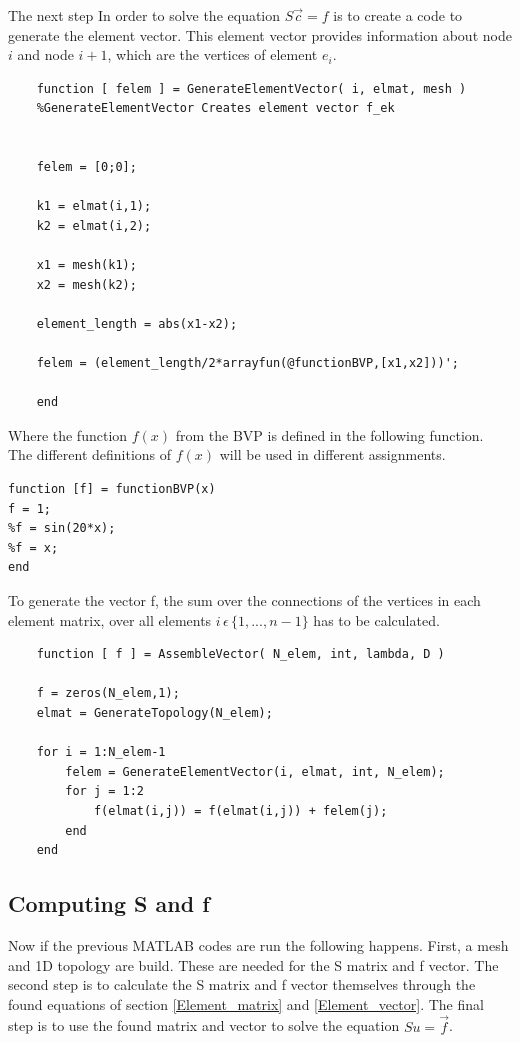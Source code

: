 \documentclass[a4paper]{report}
\begin{document}
The next step In order to solve the equation $S\vec{c}=f$ is to create a code to generate the element vector. This element vector provides information about node $i$ and node $i+1$, which are the vertices of element $e_i$.\\



\begin{lstlisting}
	function [ felem ] = GenerateElementVector( i, elmat, mesh )
	%GenerateElementVector Creates element vector f_ek
	
	
	felem = [0;0];
	
	k1 = elmat(i,1);
	k2 = elmat(i,2);
	
	x1 = mesh(k1);
	x2 = mesh(k2);
	
	element_length = abs(x1-x2);
	
	felem = (element_length/2*arrayfun(@functionBVP,[x1,x2]))';
	
	end
\end{lstlisting}

Where the function $f(x)$ from the BVP is defined in the following function. The different definitions of $f(x)$ will be used in different assignments.

\begin{lstlisting}
function [f] = functionBVP(x)
f = 1;
%f = sin(20*x);
%f = x;
end
\end{lstlisting}

\smallskip

To generate the vector f, the sum over the connections of the vertices in each element matrix, over all elements $i\,\epsilon\, \{1,...,n-1\}$  has to be calculated. 

\bigskip

	
\begin{lstlisting}
	function [ f ] = AssembleVector( N_elem, int, lambda, D )
		
	f = zeros(N_elem,1);
	elmat = GenerateTopology(N_elem);
		
	for i = 1:N_elem-1
		felem = GenerateElementVector(i, elmat, int, N_elem);
		for j = 1:2
			f(elmat(i,j)) = f(elmat(i,j)) + felem(j);
		end
	end
\end{lstlisting}	




\subsection{Computing S and f}

Now if the previous MATLAB codes are run the following happens. First, a mesh and 1D topology are build. These are needed for the S matrix and f vector. The second step is to calculate the S matrix and f vector themselves through the found equations of section \ref{Element_matrix} and \ref{Element_vector}. The final step is to use the found matrix and vector to solve the equation $Su=\vec{f}$.
\end{document}
